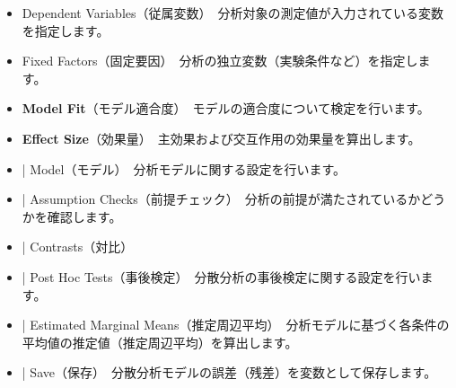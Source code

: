 \documentclass[
  12pt,
  a5jpaper,
  lualatex, ja=standard]{bxjsbook}
\providecommand{\tightlist}{%
  \setlength{\itemsep}{0pt}\setlength{\parskip}{0pt}}
\newenvironment{jmvsettings}{%
	\begin{center}%
	\begin{tcolorbox}[%
		title=設定項目,
		colframe=gmoji,
		colbacktitle=gmoji,
		colback=gmoji!2!white,
		breakable,
		width=.9\textwidth,
		]\small\addtolength{\leftmargini}{-3\labelsep}%
	}%
	{\end{tcolorbox}\end{center}}
\begin{document}
\begin{jmvsettings}

\begin{itemize}
\tightlist
\item
  Dependent Variables（従属変数）　分析対象の測定値が入力されている変数を指定します。
\item
  Fixed Factors（固定要因）　分析の独立変数（実験条件など）を指定します。
\item
  \textbf{Model Fit}（モデル適合度）　モデルの適合度について検定を行います。
\item
  \textbf{Effect Size}（効果量）　主効果および交互作用の効果量を算出します。
\item
  \colorbox{bar}{\textcolor{gmoji2}{| Model}}（モデル）　分析モデルに関する設定を行います。
\item
  \colorbox{bar}{\textcolor{gmoji2}{| Assumption Checks}}（前提チェック）　分析の前提が満たされているかどうかを確認します。
\item
  \colorbox{bar}{\textcolor{gmoji2}{| Contrasts}}（対比）　
\item
  \colorbox{bar}{\textcolor{gmoji2}{| Post Hoc Tests}}（事後検定）　分散分析の事後検定に関する設定を行います。
\item
  \colorbox{bar}{\textcolor{gmoji2}{| Estimated Marginal Means}}（推定周辺平均）　分析モデルに基づく各条件の平均値の推定値（推定周辺平均）を算出します。
\item
  \colorbox{bar}{\textcolor{gmoji2}{| Save}}（保存）　分散分析モデルの誤差（残差）を変数として保存します。
\end{itemize}

\end{jmvsettings}
\end{document}
